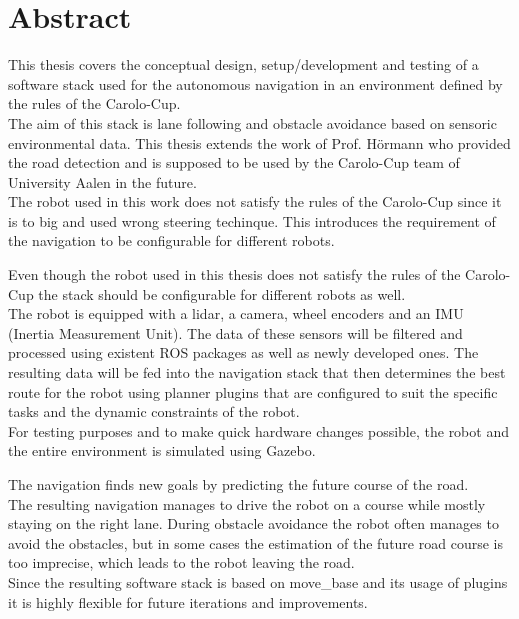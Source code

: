 \chapter*{Abstract}
\label{abstract}
This thesis covers the conceptual design, setup/development and testing of a software stack used for the autonomous navigation in an environment defined by the rules of the Carolo-Cup.\\

 The aim of this stack is lane following and obstacle avoidance based on sensoric environmental data. This thesis extends the work of Prof. Hörmann who provided the road detection and is supposed to be used by the Carolo-Cup team of University Aalen in the future.\\
 The robot used in this work does not satisfy the rules of the Carolo-Cup since it is to big and used wrong steering techinque. This introduces the requirement of the navigation to be configurable for different robots.
 
 Even though the robot used in this thesis does not satisfy the rules of the Carolo-Cup the stack should be configurable for different robots as well.\\
The robot is equipped with a lidar, a camera, wheel encoders and an IMU (Inertia Measurement Unit). The data of these sensors will be filtered and processed using existent ROS packages as well as newly developed ones. The resulting data will be fed into the navigation stack that then determines the best route for the robot using planner plugins that are configured to suit the specific tasks and the dynamic constraints of the robot.\\

For testing purposes and to make quick hardware changes possible, the robot and the entire environment is simulated using Gazebo.\\

The navigation finds new goals by predicting the future course of the road.\\

The resulting navigation manages to drive the robot on a course while mostly staying on the right lane. During obstacle avoidance the robot often manages to avoid the obstacles, but in some cases the estimation of the future road course is too imprecise, which leads to the robot leaving the road.\\

Since the resulting software stack is based on move\_base and its usage of plugins it is highly flexible for future iterations and improvements.\\